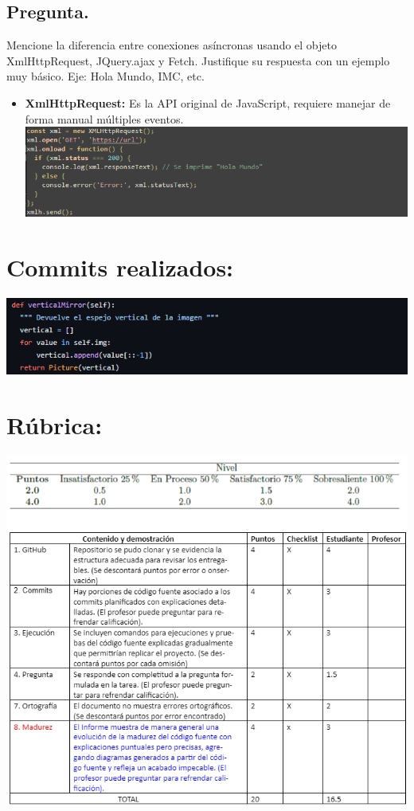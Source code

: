 \documentclass{article}
\begin{document}
\subsection*{Pregunta.}
Mencione la diferencia entre conexiones asíncronas usando el objeto XmlHttpRequest, JQuery.ajax y Fetch. Justifique su respuesta con un ejemplo muy básico. Eje: Hola Mundo, IMC, etc.
\begin{itemize}
\item \textbf{XmlHttpRequest: } Es la API original de JavaScript, requiere manejar de forma manual múltiples eventos.\\



\includegraphics[width=\textwidth]{img/xml.png}
\end{itemize}
\section{Commits realizados:}




\includegraphics[width=\textwidth]{img/1.png}
\section{Rúbrica:}




\includegraphics[width=\textwidth]{img/rubrica.png}
\end{document}
